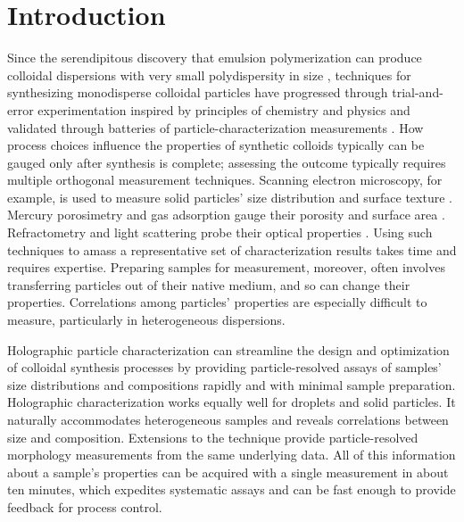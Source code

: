 \documentclass[journal=langd5,manuscript=article,layout=twocolumn]{achemso}
\begin{document}
\section{Introduction}
\label{sec:introduction}
Since the serendipitous discovery that emulsion polymerization
can produce colloidal dispersions with very small polydispersity
in size
\cite{backus1949small,gerould1950comments},
techniques for synthesizing
monodisperse colloidal particles have progressed
through trial-and-error experimentation
inspired by principles of chemistry and physics 
and validated through batteries of particle-characterization
measurements 
\cite{vanderhoff1956some,stober1968controlled,kotera1970colloid,dezelic1970preparation,goodwin1974studies,antl1986preparation}.
How process choices influence the properties of synthetic colloids
typically can be gauged only after
synthesis is complete;
assessing the outcome typically requires
multiple orthogonal measurement techniques.
Scanning electron microscopy, for example, is used to measure solid particles' size distribution and surface texture \cite{yamada85}.
Mercury porosimetry and gas adsorption gauge their porosity \cite{giesche2006mercury} and surface area \cite{rouquerol1994}. 
Refractometry and light scattering probe their optical properties \cite{chou54}.
Using such techniques to amass a representative 
set of characterization results
takes time and requires expertise.
Preparing samples for measurement, moreover, often involves
transferring particles out of their native medium,
and so can change their properties.
Correlations among particles' properties are especially
difficult to measure, particularly in heterogeneous
dispersions.

Holographic particle characterization can streamline
the design and optimization of colloidal synthesis processes
by providing particle-resolved assays of samples' size distributions
and compositions rapidly and with minimal sample preparation.
Holographic characterization works equally
well for droplets and solid particles. It naturally accommodates heterogeneous
samples and reveals correlations between size and composition. Extensions to the technique
provide particle-resolved morphology measurements from the same underlying data.
All of this information about a sample's properties can be acquired with a
single measurement in about ten minutes, which
expedites systematic assays and can be fast enough to provide feedback
for process control.
\end{document}
